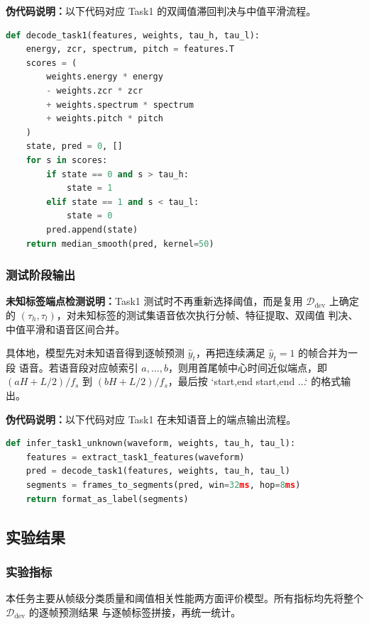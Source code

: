 \documentclass[a4paper]{article}
\begin{document}
\textbf{伪代码说明：}以下代码对应 Task1 的双阈值滞回判决与中值平滑流程。

\begin{lstlisting}[language=python]
def decode_task1(features, weights, tau_h, tau_l):
    energy, zcr, spectrum, pitch = features.T
    scores = (
        weights.energy * energy
        - weights.zcr * zcr
        + weights.spectrum * spectrum
        + weights.pitch * pitch
    )
    state, pred = 0, []
    for s in scores:
        if state == 0 and s > tau_h:
            state = 1
        elif state == 1 and s < tau_l:
            state = 0
        pred.append(state)
    return median_smooth(pred, kernel=50)
\end{lstlisting}

\subsubsection{测试阶段输出}

\textbf{未知标签端点检测说明：}Task1 测试时不再重新选择阈值，而是复用
$\mathcal{D}_{\text{dev}}$ 上确定的 $(\tau_h,\tau_l)$，对未知标签的测试集语音依次执行分帧、特征提取、双阈值
判决、中值平滑和语音区间合并。

具体地，模型先对未知语音得到逐帧预测 $\hat{y}_t$，再把连续满足 $\hat{y}_t=1$ 的帧合并为一段
语音。若语音段对应帧索引 $a,\dots,b$，则用首尾帧中心时间近似端点，即
$(aH+L/2)/f_s$ 到 $(bH+L/2)/f_s$，最后按 `start,end start,end ...` 的格式输出。

\textbf{伪代码说明：}以下代码对应 Task1 在未知语音上的端点输出流程。

\begin{lstlisting}[language=python]
def infer_task1_unknown(waveform, weights, tau_h, tau_l):
    features = extract_task1_features(waveform)
    pred = decode_task1(features, weights, tau_h, tau_l)
    segments = frames_to_segments(pred, win=32ms, hop=8ms)
    return format_as_label(segments)
\end{lstlisting}

\subsection{实验结果}

\subsubsection{实验指标}

本任务主要从帧级分类质量和阈值相关性能两方面评价模型。所有指标均先将整个 $\mathcal{D}_{\text{dev}}$ 的逐帧预测结果
与逐帧标签拼接，再统一统计。
\end{document}
